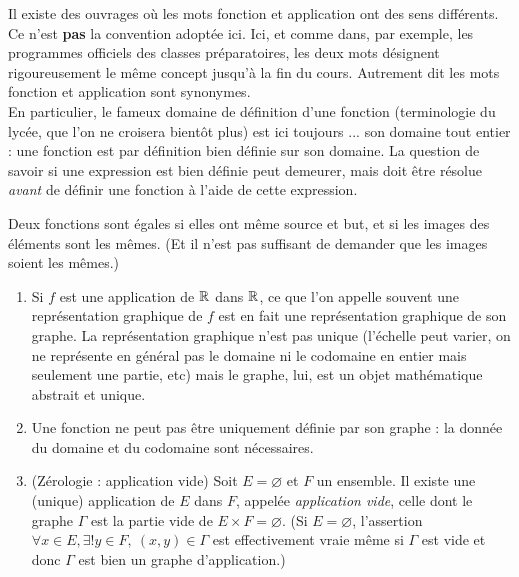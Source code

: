 \begin{attention}
Il existe des ouvrages où les mots \og fonction\fg{} et \og application\fg{} ont des sens différents. Ce n'est \textbf{pas} la convention adoptée ici. Ici, et comme dans, par exemple, les programmes officiels des classes préparatoires, les deux mots désignent rigoureusement le même concept jusqu'à la fin du cours. Autrement dit les mots \og fonction\fg{} et \og application\fg{} sont synonymes.\\
 En particulier, le fameux \og domaine de définition d'une fonction\fg{} (terminologie du lycée, que l'on ne croisera bientôt plus) est ici toujours ...  son domaine tout entier : une fonction est par définition bien définie sur son domaine. La question de savoir si une expression est bien définie peut demeurer, mais doit être résolue \emph{avant} de définir une fonction à l'aide de cette expression.
\end{attention}

Deux fonctions sont égales si elles ont même source et but, et si les images des éléments sont les mêmes. (Et il n'est pas suffisant de demander que les images soient les mêmes.)



\begin{remarque}
\begin{enumerate}
\item Si $f$ est une application de $\mathbb{R}$ dans $\mathbb{R}$, ce que l'on appelle souvent une \og représentation graphique de $f$\fg{} est en fait une représentation graphique de son graphe. La représentation graphique n'est pas unique (l'échelle peut varier, on ne représente en général pas le domaine ni le codomaine en entier mais seulement une partie, etc) mais le graphe, lui, est un objet mathématique abstrait et unique.
\item Une fonction ne peut pas être uniquement définie par son graphe : la donnée du domaine et du codomaine sont nécessaires.
\item {} (Zérologie : application vide) Soit $E = \varnothing$ et $F$ un ensemble. Il existe une (unique) application de $E$ dans $F$, appelée \emph{application vide}, celle dont le graphe $\Gamma$ est la partie vide de $E\times F = \varnothing$. (Si $E=\varnothing$,  l'assertion \og $\forall x\in E, \exists! y\in F,\: (x,y)\in \Gamma$\fg{} est effectivement vraie même si $\Gamma$ est vide et donc $\Gamma$ est bien un graphe d'application.)
\end{enumerate}
\end{remarque}

